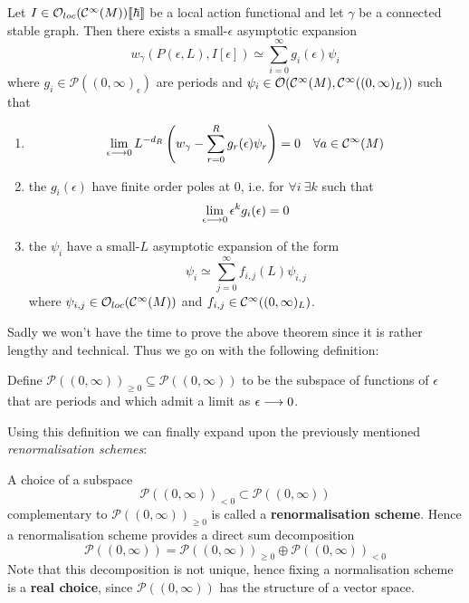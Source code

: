 \begin{theo}
  Let $I \in \mathcal{O}_{loc}(\mathcal{C}^{\infty}(M))\llbracket \hbar \rrbracket$ be a local action functional and let $\gamma$ be a connected stable graph. Then there exists a small-$\epsilon$ asymptotic expansion
  $$ w_\gamma (P(\epsilon,L), I[\epsilon]) \simeq \sum_{i=0}^{\infty} g_i(\epsilon) \psi_i $$
  where $g_i \in \mathcal{P}((0,\infty)_\epsilon)$ are periods and $\psi_i \in \mathcal{O}(\mathcal{C}^{\infty}(M), \mathcal{C}^{\infty}((0,\infty)_L))$ such that
  \begin{enumerate}
    \item $$ \lim_{\epsilon\lra 0} L^{-d_R} \left(w_\gamma - \sum_{r=0}^R g_r(\epsilon) \psi_r \right) = 0 \quad \forall a \in \Ci(M) $$

    \item the $g_i(\epsilon)$ have finite order poles at $0$, i.e. for $\forall i \ \exists k$ such that
    $$ \lim_{\epsilon\lra 0} \epsilon^k g_i(\epsilon) = 0 $$

    \item the $\psi_i$ have a small-$L$ asymptotic expansion of the form
    $$ \psi_i \simeq \sum_{j=0}^{\infty} f_{i,j} (L) \psi_{i,j} $$
    where $\psi_{i,j} \in \mathcal{O}_{loc}(\mathcal{C}^{\infty}(M))$ and $f_{i,j} \in \mathcal{C}^{\infty}((0,\infty)_L)$.
  \end{enumerate}
\end{theo}

Sadly we won't have the time to prove the above theorem since it is rather lengthy and technical. Thus we go on with the following definition:

\begin{definition}
  Define $\mathcal{P}((0,\infty))_{\geq 0} \subseteq \mathcal{P}((0,\infty))$ to be the subspace of functions of $\epsilon$ that are periods and which admit a limit as $\epsilon \lra 0$.
\end{definition}

Using this definition we can finally expand upon the previously mentioned \emph{renormalisation schemes}:

\begin{definition}
  A choice of a subspace
  $$ \mathcal{P}((0,\infty))_{< 0} \subset \mathcal{P}((0,\infty))  $$
  complementary to $\mathcal{P}((0,\infty))_{\geq 0}$ is called a \textbf{renormalisation scheme}. Hence a renormalisation scheme provides a direct sum decomposition
  $$ \mathcal{P}((0,\infty)) = \mathcal{P}((0,\infty))_{\geq 0} \oplus \mathcal{P}((0,\infty))_{< 0} $$
  Note that this decomposition is not unique, hence fixing a normalisation scheme is a \textbf{real choice}, since $\mathcal{P}((0,\infty))$ has the structure of a vector space.
\end{definition}

